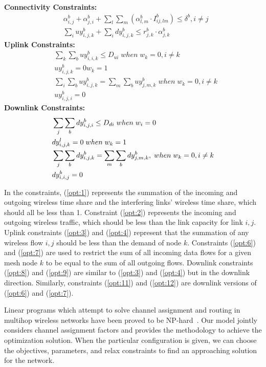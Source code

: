 \noindent
{\bf Connectivity Constraints:}
\begin{align}
\label{opt:1}
& \alpha_{i,j}^b + \alpha_{j,i}^b + \sum_l\sum_m(\alpha_{l,m}^b \cdot I_{ij,lm}^b) \leq \delta^b, i\neq j \\
\label{opt:2}
& \sum_i uy_{i,j,k}^b + \sum_i dy_{i,j,k}^b \leq r_{j,k}^b \cdot \alpha_{j,k}^b 
\end{align}
\noindent
{\bf Uplink Constraints:} 
\begin{align}
\label{opt:3}
& \sum_k \sum_b uy_{i,i,k}^b \leq D_{ui} \; when \; w_k=0, i \neq k \\
\label{opt:4}
& uy_{i,j,k}^b = 0 w_k=1 \\
\label{opt:6}
& \sum_i\sum_b uy_{i,j,k}^b = \sum_m \sum_b uy_{j,m,k}^b \; when \; w_k=0, i \neq k\\
\label{opt:7}
& uy_{i,j,i}^b=0 
\end{align}
\noindent
{\bf Downlink Constraints:} 
\begin{align}
{\bf}
\label{opt:8}
& \sum_j \sum_b dy_{i,j,i}^b \leq D_{di} \; when \; w_i=0 \\
\label{opt:9}
& dy_{i,j,k}^l =0 \; when \; w_k=1 \\
\label{opt:11}
& \sum_j\sum_b dy_{i,j,k}^b = \sum_m \sum_b dy_{j,m,k}^b,\; when \; w_k=0,  i \neq k \\
\label{opt:12}
& dy_{i,i,j}^b=0
\end{align}

In the constraints, (\ref{opt:1}) represents the summation of the incoming and outgoing 
wireless time share and the interfering links' wireless time share, which should all be less than 1.
Constraint (\ref{opt:2}) represents the incoming and outgoing wireless traffic, which 
should be less than the link capacity for link $i,j$. Uplink constraints (\ref{opt:3})
and (\ref{opt:4}) represent that the summation of any wireless flow $i,j$ should be less than
the demand of node $k$.  Constraints (\ref{opt:6}) and (\ref{opt:7}) are used to restrict
the sum of all incoming data flows for a given mesh node $k$ to be equal to the 
sum of all outgoing flows. Downlink constraints (\ref{opt:8}) and (\ref{opt:9}) are
similar to (\ref{opt:3}) and (\ref{opt:4}) but in the downlink direction.  Similarly,
constraints (\ref{opt:11}) and (\ref{opt:12}) are downlink versions of 
(\ref{opt:6}) and (\ref{opt:7}).

Linear programs which attempt to solve channel assignment and routing in multihop
wireless networks have been proved to be NP-hard~\cite{yuan2006cross}. 
Our model jointly considers channel assignment factors and provides the 
methodology to achieve the optimization solution. 
When the particular configuration is given, we can 
choose the objectives, parameters, and relax constraints to 
find an approaching solution for the network.  
 

